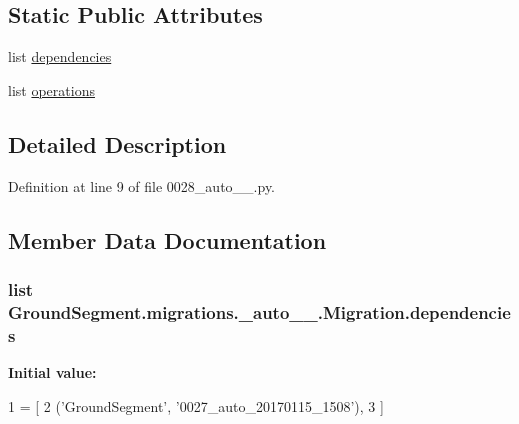 \subsection*{Static Public Attributes}
\begin{DoxyCompactItemize}
\item 
list \hyperlink{class_ground_segment_1_1migrations_1_10028__auto__20170115__1524_1_1_migration_ae94e3a903df829805554b591e736785f}{dependencies}
\item 
list \hyperlink{class_ground_segment_1_1migrations_1_10028__auto__20170115__1524_1_1_migration_a1bc752acd28e76bac6c1e2b50b231fc9}{operations}
\end{DoxyCompactItemize}


\subsection{Detailed Description}


Definition at line 9 of file 0028\+\_\+auto\+\_\+\_.\+py.



\subsection{Member Data Documentation}
\hypertarget{class_ground_segment_1_1migrations_1_10028__auto__20170115__1524_1_1_migration_ae94e3a903df829805554b591e736785f}{}
\subsubsection[{dependencies}]{\setlength{\rightskip}{0pt plus 5cm}list Ground\+Segment.\+migrations.\+\_\+auto\+\_\+\_.\+Migration.\+dependencies\hspace{0.3cm}{\ttfamily [static]}}\label{class_ground_segment_1_1migrations_1_10028__auto__20170115__1524_1_1_migration_ae94e3a903df829805554b591e736785f}
{\bfseries Initial value\+:}
\begin{DoxyCode}
1 = [
2         (\textcolor{stringliteral}{'GroundSegment'}, \textcolor{stringliteral}{'0027\_auto\_20170115\_1508'}),
3     ]
\end{DoxyCode}


